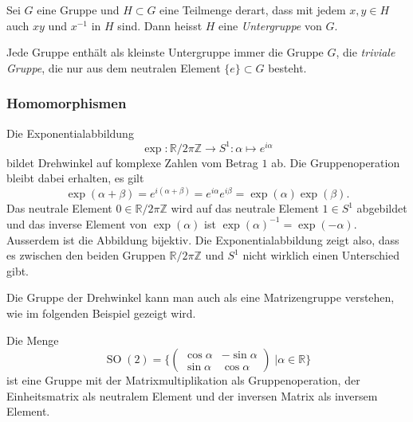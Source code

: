 \begin{definition}
\label{buch:gruppen:definition:def:untergruppe}
Sei $G$ eine Gruppe und $H\subset G$ eine Teilmenge derart,
dass mit jedem $x,y\in H$ auch $xy$ und $x^{-1}$ in $H$ sind.
Dann heisst $H$ eine {\em Untergruppe} von $G$.
%
\end{definition}

Jede Gruppe enthält als kleinste Untergruppe immer die Gruppe $G$,
die {\em triviale Gruppe}, die nur aus dem neutralen Element
$\{e\}\subset G$ besteht.

%
%
\subsubsection{Homomorphismen}
Die Exponentialabbildung
\[
\exp
\colon
\mathbb{R}/2\pi\mathbb{Z} \to S^1
:
\alpha \mapsto e^{i\alpha}
\]
bildet Drehwinkel auf komplexe Zahlen vom Betrag $1$ ab.
Die Gruppenoperation bleibt dabei erhalten, es gilt
\[
\exp(\alpha + \beta)
=
e^{i(\alpha+\beta)}
=
e^{i\alpha}
e^{i\beta}
=
\exp(\alpha)
\exp(\beta).
\]
Das neutrale Element $0\in\mathbb{R}/2\pi\mathbb{Z}$ wird auf
das neutrale Element $1\in S^1$ abgebildet und das inverse
Element von $\exp(\alpha)$ ist
$ \exp(\alpha)^{-1} = \exp(-\alpha) $.
Ausserdem ist die Abbildung bijektiv.
Die Exponentialabbildung zeigt also, dass es zwischen den beiden
Gruppen $\mathbb{R}/2\pi\mathbb{Z}$ und $S^1$ nicht wirklich einen
Unterschied gibt.

Die Gruppe der Drehwinkel kann man auch als eine Matrizengruppe
verstehen, wie im folgenden Beispiel gezeigt wird.

\begin{beispiel}
Die Menge
\[
\operatorname{SO}(2)
=
\biggl\{
\begin{pmatrix}
\cos\alpha & -\sin\alpha \\
\sin\alpha &  \cos\alpha
\end{pmatrix}
\;
\bigg|
\alpha\in\mathbb{R}
\biggr\}
\]
ist eine Gruppe mit der Matrixmultiplikation als Gruppenoperation,
der Einheitsmatrix als neutralem Element und der inversen Matrix
als inversem Element.
\end{beispiel}

